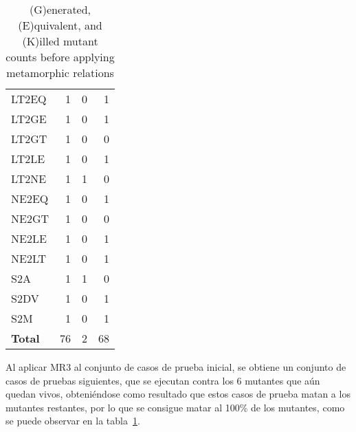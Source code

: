 \begin{table}
\begin{tabular}{lrrr}
LT2EQ   &       1       &       0       &       1       \\
LT2GE   &       1       &       0       &       1       \\
LT2GT   &       1       &       0       &       0       \\
LT2LE   &       1       &       0       &       1       \\
LT2NE   &       1       &       1       &       0       \\
NE2EQ   &       1       &       0       &       1       \\
NE2GT   &       1       &       0       &       0       \\
NE2LE   &       1       &       0       &       1       \\
NE2LT   &       1       &       0       &       1       \\
S2A         &   1       &       1       &       0       \\
S2DV    &       1       &       0       &       1       \\
S2M         &   1       &       0       &       1       \\

    \midrule
    \textbf{Total} & 76 & 2 & 68 \\
    \bottomrule
    \end{tabular}
    \caption{(G)enerated, (E)quivalent, and (K)illed mutant counts before applying metamorphic relations}
    \label{tab:mutant-counts}
\end{table}


Al aplicar MR3 al conjunto de casos de prueba inicial, se obtiene un conjunto de casos de pruebas siguientes, que se ejecutan contra los 6 mutantes que aún quedan vivos, obteniéndose como resultado que estos casos de prueba matan a los mutantes restantes, por lo que se consigue matar al 100\% de los mutantes, como se puede observar en la tabla~\ref{tab:mutant-counts}.



